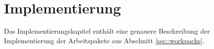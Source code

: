 \chapter{Implementierung}\label{chap::impl}
Das Implementierungskapitel enthält eine genauere Beschreibung der Implementierung der Arbeitspakete aus Abschnitt \ref{sec::workpacks}.
